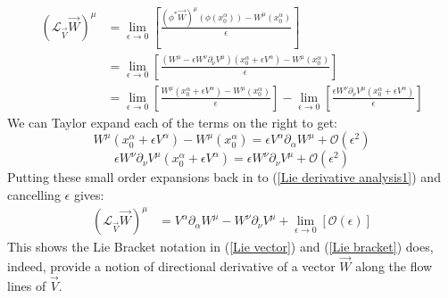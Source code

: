 \documentclass[10pt]{article}
\begin{document}
\begin{equation}
\label{Lie derivative analysis2}
\begin{aligned}
  \left(\mathcal{L}_{\vec V} \vec W\right)^\mu &= \lim\limits _{\epsilon \rightarrow 0}\left[\frac{\left(\phi^\ast \vec W \right)^\mu (\phi(x^\alpha_0))-W^\mu(x^\alpha_0)}{\epsilon}\right] \\
   &= \lim\limits _{\epsilon \rightarrow 0}\left[\frac{(W^\mu-\epsilon W^\nu \partial_\nu V^\mu) (x^\alpha_0 + \epsilon V^\alpha)-W^\mu(x^\alpha_0)}{\epsilon}\right] \\
&= \lim\limits _{\epsilon \rightarrow 0}\left[\frac{W^\mu (x^\alpha_0 + \epsilon V^\alpha)-W^\mu(x^\alpha_0)}{\epsilon}\right]-\lim\limits _{\epsilon \rightarrow 0}\left[\frac{\epsilon W^\nu \partial_\nu V^\mu (x^\alpha_0 + \epsilon V^\alpha)}{\epsilon}\right]
\end{aligned}
\end{equation}
We can Taylor expand each of the terms on the right to get:
\begin{equation}
\label{Lie derivative analysis3}
W^\mu (x^\alpha_0 + \epsilon V^\alpha)-W^\mu(x^\alpha_0)= \epsilon V^\alpha \partial_\alpha W^\mu+\mathcal{O}(\epsilon^2)
\end{equation}
\begin{equation}
\label{Lie derivative analysis4}
\epsilon W^\nu \partial_\nu V^\mu (x^\alpha_0 + \epsilon V^\alpha)= \epsilon W^\nu \partial_\nu V^\mu+\mathcal{O}(\epsilon^2)
\end{equation}
Putting these small order expansions back in to (\ref{Lie derivative analysis1}) and cancelling $\epsilon$ gives:
\begin{equation}
\label{Lie derivative analysis5}
\begin{aligned}
  \left(\mathcal{L}_{\vec V} \vec W\right)^\mu &= V^\alpha \partial_\alpha W^\mu-W^\nu \partial_\nu V^\mu +\lim\limits _{\epsilon \rightarrow 0}\left[\mathcal{O}(\epsilon)\right]
\end{aligned}
\end{equation}
This shows the Lie Bracket notation in (\ref{Lie vector}) and (\ref{Lie bracket}) does, indeed, provide a notion of directional derivative of a vector $\vec W$ along the flow lines of $\vec V$.
\end{document}

